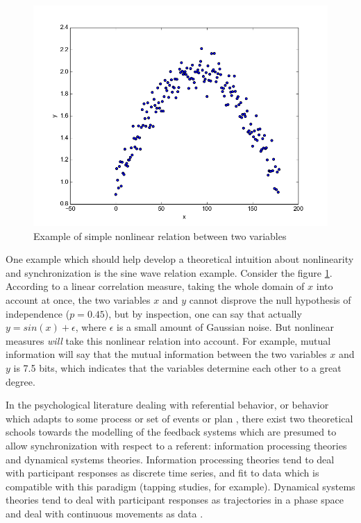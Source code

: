 \documentclass[12pt]{article}
\begin{document}
\begin{figure}\label{fig:nonlinearity}
  \begin{center}
    \includegraphics[scale=0.5]{mi_ex}
  \end{center}
  \caption{Example of simple nonlinear relation between two variables}
\end{figure}

One example which should help develop a theoretical intuition about nonlinearity and synchronization is the sine wave relation example. Consider the figure \ref{fig:nonlinearity}. According to a linear correlation measure, taking the whole domain of $x$ into account at once, the two variables $x$ and $y$ cannot disprove the null hypothesis of independence ($p=0.45$), but by inspection, one can say that actually $y = sin(x) + \epsilon$, where $\epsilon$ is a small amount of Gaussian noise. But nonlinear measures \emph{will} take this nonlinear relation into account. For example, mutual information will say that the mutual information between the two variables $x$ and $y$ is 7.5 bits, which indicates that the variables determine each other to a great degree.

In the psychological literature dealing with referential behavior, or behavior which adapts to some process or set of events or plan \cite{pressing}, there exist two theoretical schools towards the modelling of the feedback systems which are presumed to allow synchronization with respect to a referent: information processing theories and dynamical systems theories. Information processing theories tend to deal with participant responses as discrete time series, and fit to data which is compatible with this paradigm (tapping studies, for example). Dynamical systems theories tend to deal with participant responses as trajectories in a phase space and deal with continuous movements as data \cite{repp}.
\end{document}
